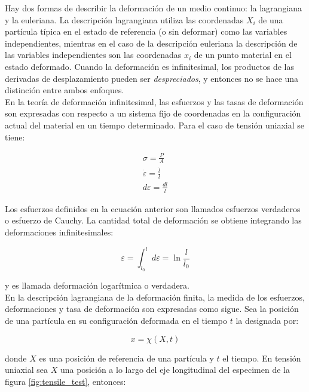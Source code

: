 Hay dos formas de describir la deformación de un medio continuo: la lagrangiana y la euleriana. 
La descripción lagrangiana utiliza las coordenadas $X_i$ de una partícula típica en el estado 
de referencia (o sin deformar) como las variables independientes, mientras en el caso 
de la descripción euleriana la descripción de las variables independientes son las coordenadas 
$x_i$ de un punto material en el estado deformado. Cuando la deformación es infinitesimal, los 
productos de las derivadas de desplazamiento pueden ser \textit{despreciados}, y entonces no 
se hace una distinción entre ambos enfoques. ~\cite{kobayashi1989} \\

En la teoría de deformación infinitesimal, las esfuerzos y las tasas de deformación son expresadas 
con respecto a un sistema fijo de coordenadas en la configuración actual del material en 
un tiempo determinado. Para el caso de tensión uniaxial se tiene: ~\cite{kobayashi1989}

\begin{align}
\sigma = \frac{P}{A} \label{eq:simple_stress} \\ 
\dot{\varepsilon} = \frac{\dot{l}}{l} \label{eq:strain_rate} \\
d\varepsilon = \frac{dl}{l} \label{eq:strain_diff}
\end{align}

Los esfuerzos definidos en la ecuación anterior son llamados esfuerzos verdaderos o 
esfuerzo de Cauchy. La cantidad total de deformación se obtiene integrando las deformaciones 
infinitesimales:

\begin{equation} \label{eq:true_strain_integral}
\varepsilon = \int_{l_0}^{l} d\varepsilon = \ln{\frac{l}{l_0}}
\end{equation}

y es llamada deformación logarítmica o verdadera.\\

En la descripción lagrangiana de la deformación finita, la medida de los esfuerzos, 
deformaciones y tasa de deformación son expresadas como sigue. Sea la posición 
de una partícula en su configuración deformada en el tiempo $t$ la designada por: 

\begin{equation}
x = \chi(X,t)
\end{equation}

donde $X$ es una posición de referencia de una partícula y $t$ el tiempo. En 
tensión uniaxial sea $X$ una posición a lo largo del eje longitudinal del 
especimen de la figura \ref{fig:tensile_test}, entonces:

